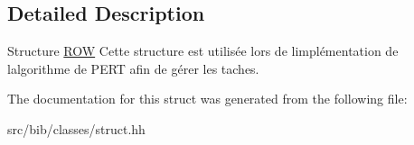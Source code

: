 \subsection{Detailed Description}
Structure \hyperlink{structROW}{R\+OW} Cette structure est utilis\'{e}e lors de l\textquotesingle{}impl\'{e}mentation de l\textquotesingle{}algorithme de P\+E\+RT afin de g\'{e}rer les taches. 

The documentation for this struct was generated from the following file\+:\begin{DoxyCompactItemize}
\item 
src/bib/classes/struct.\+hh\end{DoxyCompactItemize}
